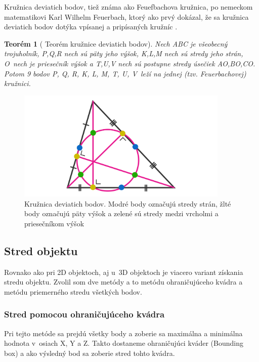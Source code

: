 Kružnica deviatich bodov, tiež známa ako Feuefbachova kružnica, po nemeckom matematikovi Karl Wilhelm Feuerbach, ktorý ako prvý dokázal, že sa kružnica deviatich bodov dotýka vpísanej a pripísaných kružníc \cite{NinePointTheorem}.


\newtheorem{theorem}{Teorém}
 
\begin{theorem}[{\cite{vyznamne_prvky_trojuholnika} Teorém kružnice deviatich bodov}]
Nech ABC je všeobecný trojuholník, P,Q,R nech sú päty jeho výšok, K,L,M nech sú stredy jeho strán, O~nech je priesečník výšok a T,U,V nech sú postupne stredy úsečiek AO,BO,CO. Potom 9 bodov P, Q, R, K, L, M, T, U, V~leží na jednej (tzv. Feuerbachovej) kružnici. 

\end{theorem}


\begin{figure}[H]
	\centering
	\includegraphics[width=0.9\textwidth]{obrazky-figures/NinePointCircle.png}
	\caption{Kružnica deviatich bodov. Modré body označujú stredy strán, žlté body označujú päty výšok a zelené sú stredy medzi vrcholmi a priesečníkom výšok\cite{katz_prakash_khim}}
	\label{fig:TriangleCenters_ninePoints}
\end{figure}



\subsection*{Stred objektu}

Rovnako ako pri 2D objektoch, aj u~3D objektoch je viacero variant získania stredu objektu. Zvolil som dve metódy a to metódu ohraničujúceho kvádra a metódu priemerného stredu všetkých bodov.


\subsubsection{Stred pomocou ohraničujúceho kvádra}
Pri tejto metóde sa prejdú všetky body a zoberie sa maximálna a minimálna hodnota v~osiach X, Y a Z. Takto dostaneme ohraničujúci kváder (Bounding box) a ako výsledný bod sa zoberie stred tohto kvádra.
		
